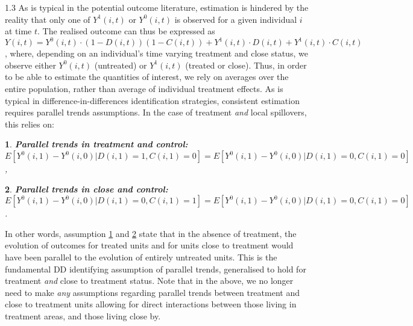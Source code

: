 \documentclass[12pt]{article}
\makeatletter
\newtheorem*{assumption*}{\assumptionnumber}
\providecommand{\assumptionnumber}{}
\newenvironment{assumption}[2]
 {%
  \renewcommand{\assumptionnumber}{Assumption #1{#2}}%
  \begin{assumption*}%
  \protected@edef\@currentlabel{#1}%
 }
 {%
  \end{assumption*}
 }
\makeatother
\begin{document}
\begin{spacing}{1.3}
As is typical in the potential outcome literature, estimation is hindered by the
reality that only one of $Y^1(i,t)$ or $Y^0(i,t)$ is observed for a given 
individual $i$ at time $t$.  The realised outcome can thus be expressed as 
$Y(i,t)=Y^0(i,t)\cdot (1-D(i,t))(1-C(i,t))+Y^1(i,t)\cdot D(i,t)+Y^1(i,t)\cdot 
C(i,t)$, where, depending on an individual's time varying treatment and close
status, we observe either $Y^0(i,t)$ (untreated) or $Y^1(i,t)$ (treated or 
close).  Thus, in order to be able to estimate the quantities of interest, we 
rely on averages over the entire population, rather than average of individual 
treatment effects.  As is typical in difference-in-differences identification
strategies, consistent estimation requires parallel trends assumptions.  In the 
case of treatment \emph{and} local spillovers, this relies on:

\begin{assumption}{1}{}
\label{Sass:PT}
\textbf{Parallel trends in treatment and control:} \\
$E[Y^0(i,1)-Y^0(i,0)|D(i,1)=1,C(i,1)=0]=
E[Y^0(i,1)-Y^0(i,0)|D(i,1)=0,C(i,1)=0]$,
\end{assumption}
\begin{assumption}{2}{}
\label{Sass:PTC}
\textbf{Parallel trends in close and control:} \\
$E[Y^0(i,1)-Y^0(i,0)|D(i,1)=0,C(i,1)=1]=
E[Y^0(i,1)-Y^0(i,0)|D(i,1)=0,C(i,1)=0]$.
\end{assumption}

In other words, assumption \ref{Sass:PT} and \ref{Sass:PTC} state that in the 
absence of treatment, the evolution of outcomes for treated units and for units 
close to treatment would have been parallel to the evolution of entirely 
untreated units.  This is the fundamental DD identifying assumption of parallel 
trends, generalised to hold for treatment \emph{and} close to treatment status.  
Note that in the above, we no longer need to make \emph{any} assumptions 
regarding parallel trends between treatment and close to treatment units 
allowing for direct interactions between those living in treatment areas, and
those living close by.


\end{spacing}
\end{document}

